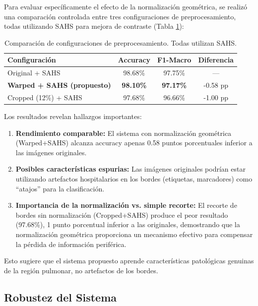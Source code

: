 \documentclass[runningheads]{llncs}
\begin{document}
Para evaluar específicamente el efecto de la normalización geométrica, se realizó una comparación controlada entre tres configuraciones de preprocesamiento, todas utilizando SAHS para mejora de contraste (Tabla \ref{tab:comparacion}):

\begin{table}[!h]
\centering
\caption{Comparación de configuraciones de preprocesamiento. Todas utilizan SAHS.}
\label{tab:comparacion}
\begin{tabular}{lccc}
\toprule
\textbf{Configuración} & \textbf{Accuracy} & \textbf{F1-Macro} & \textbf{Diferencia} \\
\midrule
Original + SAHS & 98.68\% & 97.75\% & --- \\
\textbf{Warped + SAHS (propuesto)} & \textbf{98.10\%} & \textbf{97.17\%} & -0.58 pp \\
Cropped (12\%) + SAHS & 97.68\% & 96.66\% & -1.00 pp \\
\bottomrule
\end{tabular}
\end{table}

Los resultados revelan hallazgos importantes:

\begin{enumerate}
    \item \textbf{Rendimiento comparable:} El sistema con normalización geométrica (Warped+SAHS) alcanza accuracy apenas 0.58 puntos porcentuales inferior a las imágenes originales.

    \item \textbf{Posibles características espurias:} Las imágenes originales podrían estar utilizando artefactos hospitalarios en los bordes (etiquetas, marcadores) como ``atajos'' para la clasificación.

    \item \textbf{Importancia de la normalización vs. simple recorte:} El recorte de bordes sin normalización (Cropped+SAHS) produce el peor resultado (97.68\%), 1 punto porcentual inferior a las originales, demostrando que la normalización geométrica proporciona un mecanismo efectivo para compensar la pérdida de información periférica.
\end{enumerate}

Esto sugiere que el sistema propuesto aprende características patológicas genuinas de la región pulmonar, no artefactos de los bordes.

\subsection{Robustez del Sistema}
\end{document}
